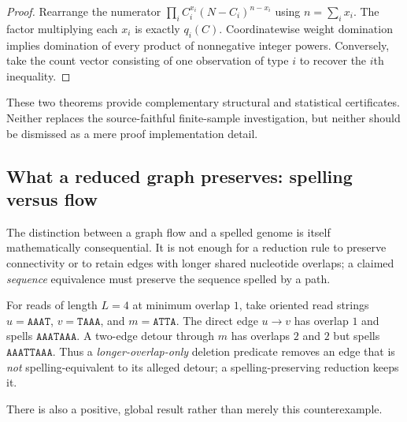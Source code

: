 \begin{proof}
Rearrange the numerator
$\prod_i C_i^{x_i}(N-C_i)^{n-x_i}$ using
$n=\sum_i x_i$. The factor multiplying each $x_i$ is exactly
$q_i(C)$. Coordinatewise weight domination implies domination
of every product of nonnegative integer powers. Conversely,
take the count vector consisting of one observation of type
$i$ to recover the $i$th inequality.
\end{proof}



These two theorems provide complementary structural and
statistical certificates. Neither replaces the source-faithful
finite-sample investigation, but neither should be dismissed as
a mere proof implementation detail.

\subsection{What a reduced graph preserves: spelling versus flow}
\label{sec:finite:spelling}

The distinction between a graph flow and a spelled genome is itself
mathematically consequential. It is not enough for a reduction rule to
preserve connectivity or to retain edges with longer shared nucleotide
overlaps; a claimed \emph{sequence} equivalence must preserve the sequence
spelled by a path.

\begin{proposition}
\label{prop:reduction-mismatch}
For reads of length $L=4$ at minimum overlap $1$, take oriented read
strings $u=\texttt{AAAT}$, $v=\texttt{TAAA}$, and
$m=\texttt{ATTA}$. The direct edge $u\to v$ has overlap $1$ and spells
$\texttt{AAATAAA}$. A two-edge detour through $m$ has overlaps $2$ and
$2$ but spells $\texttt{AAATTAAA}$. Thus a
\emph{longer-overlap-only} deletion predicate removes an edge that is
\emph{not} spelling-equivalent to its alleged detour; a
spelling-preserving reduction keeps it.
\end{proposition}



There is also a positive, global result rather than merely this
counterexample.


